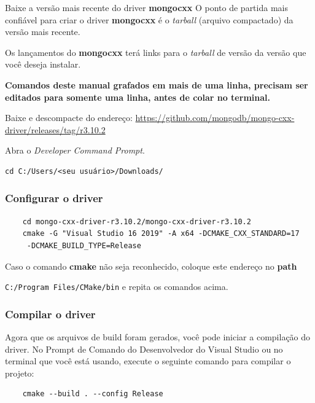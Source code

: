\documentclass[a4paper,11pt]{article}
\newcommand{\cautionbox}[1]{
	\vskip 5mm
	\begin{leftbar}
		\textbf{#1}
	\end{leftbar}
	\vskip 5mm
}
\begin{document}
Baixe a versão mais recente do driver \textbf{mongocxx}
O ponto de partida mais confiável para criar o driver \textbf{mongocxx} é o \textit{tarball} (arquivo compactado) da versão mais recente.

Os lançamentos do \textbf{mongocxx} terá links para o \textit{tarball} de versão da versão que você deseja instalar.

\cautionbox{\color{orange}Comandos deste manual grafados em mais de uma linha, precisam ser editados para somente uma linha, antes de colar no terminal.}

Baixe e descompacte do endereço: \url{https://github.com/mongodb/mongo-cxx-driver/releases/tag/r3.10.2}

Abra o \textit{Developer Command Prompt}.
\begin{mdframed}
\begin{verbatim}
cd C:/Users/<seu usuário>/Downloads/
\end{verbatim}
\end{mdframed}

\subsubsection{Configurar o driver}

\begin{mdframed}
	\begin{verbatim}
	cd mongo-cxx-driver-r3.10.2/mongo-cxx-driver-r3.10.2
	cmake -G "Visual Studio 16 2019" -A x64 -DCMAKE_CXX_STANDARD=17
	 -DCMAKE_BUILD_TYPE=Release
	\end{verbatim}
\end{mdframed}

Caso o comando \textbf{cmake} não seja reconhecido, coloque este endereço no \textbf{path}

{\tt C:/Program Files/CMake/bin} e repita os comandos acima.

\subsubsection{Compilar o driver}

Agora que os arquivos de build foram gerados, você pode iniciar a compilação do driver. No Prompt de Comando do Desenvolvedor do Visual Studio ou no terminal que você está usando, execute o seguinte comando para compilar o projeto:

\begin{mdframed}
	\begin{verbatim}
	cmake --build . --config Release
	\end{verbatim}
\end{mdframed}
\end{document}
